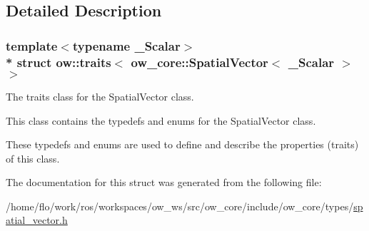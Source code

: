 \subsection{Detailed Description}
\subsubsection*{template$<$typename \+\_\+\+Scalar$>$\\*
struct ow\+::traits$<$ ow\+\_\+core\+::\+Spatial\+Vector$<$ \+\_\+\+Scalar $>$ $>$}

The traits class for the Spatial\+Vector class. 

This class contains the typedefs and enums for the Spatial\+Vector class.

These typedefs and enums are used to define and describe the properties (traits) of this class. 

The documentation for this struct was generated from the following file\+:\begin{DoxyCompactItemize}
\item 
/home/flo/work/ros/workspaces/ow\+\_\+ws/src/ow\+\_\+core/include/ow\+\_\+core/types/\hyperlink{spatial__vector_8h}{spatial\+\_\+vector.\+h}\end{DoxyCompactItemize}
